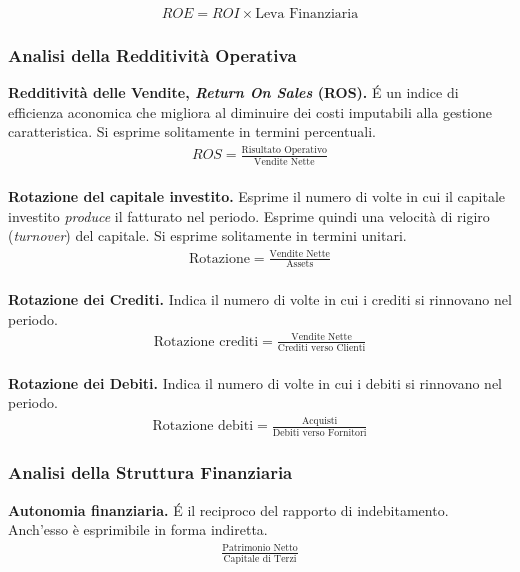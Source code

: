 \documentclass[a4paper,portrait,12pt]{article}
\theoremstyle{definition}
\begin{document}
\begin{align*}
ROE = ROI \times \text{Leva Finanziaria}
\end{align*}

\subsubsection{Analisi della Redditività Operativa}

\textbf{Redditività delle Vendite, \emph{Return On Sales} (ROS).}
\'E un indice di efficienza aconomica che migliora al diminuire dei costi imputabili alla gestione caratteristica.
Si esprime solitamente in termini percentuali.
\begin{align*}
ROS = \frac{\text{Risultato Operativo}}{\text{Vendite Nette}}
\end{align*}\\

\textbf{Rotazione del capitale investito.}
Esprime il numero di volte in cui il capitale investito \emph{produce} il fatturato nel periodo.
Esprime quindi una velocità di rigiro (\emph{turnover}) del capitale.
Si esprime solitamente in termini unitari.
\begin{align*}
\text{Rotazione} = \frac{\text{Vendite Nette}}{\text{Assets}}
\end{align*}\\

\textbf{Rotazione dei Crediti.}
Indica il numero di volte in cui i crediti si rinnovano nel periodo.
\begin{align*}
\text{Rotazione crediti} = \frac{\text{Vendite Nette}}{\text{Crediti verso Clienti}}
\end{align*}\\

\textbf{Rotazione dei Debiti.}
Indica il numero di volte in cui i debiti si rinnovano nel periodo.
\begin{align*}
\text{Rotazione debiti} = \frac{\text{Acquisti}}{\text{Debiti verso Fornitori}}
\end{align*}

\subsubsection{Analisi della Struttura Finanziaria}

\textbf{Autonomia finanziaria.}
\'E il reciproco del rapporto di indebitamento.
Anch'esso è esprimibile in forma indiretta.
\begin{align*}
\frac{\text{Patrimonio Netto}}{\text{Capitale di Terzi}}
\end{align*}\\
\end{document}

